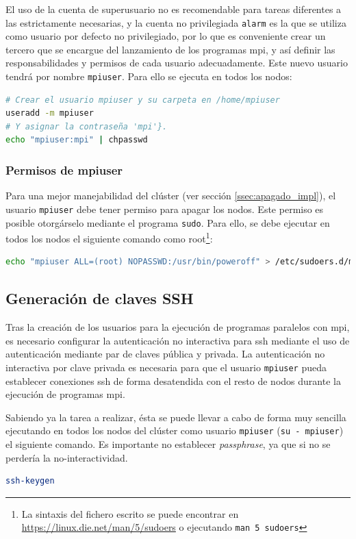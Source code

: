 El uso de la cuenta de superusuario no es recomendable para tareas diferentes a las estrictamente necesarias, y la cuenta no privilegiada \texttt{alarm} es la que se utiliza como usuario por defecto no privilegiado, por lo que es conveniente crear un tercero que se encargue del lanzamiento de los programas \acrshort{mpi}, y así definir las responsabilidades y permisos de cada usuario adecuadamente. Este nuevo usuario tendrá por nombre \texttt{mpiuser}. Para ello se ejecuta en todos los nodos:

\begin{lstlisting}[language=bash]
# Crear el usuario mpiuser y su carpeta en /home/mpiuser
useradd -m mpiuser
# Y asignar la contraseña 'mpi'}.
echo "mpiuser:mpi" | chpasswd
\end{lstlisting}

\subsubsection{Permisos de mpiuser}
Para una mejor manejabilidad del clúster (ver sección \ref{ssec:apagado_impl}), el usuario \texttt{mpiuser} debe tener permiso para apagar los nodos. Este permiso es posible otorgárselo mediante el programa \texttt{sudo}. Para ello, se debe ejecutar en todos los nodos el siguiente comando como root\footnote{La sintaxis del fichero escrito se puede encontrar en \url{https://linux.die.net/man/5/sudoers} o ejecutando \texttt{man 5 sudoers}}:

\begin{lstlisting}[language=bash]
echo "mpiuser ALL=(root) NOPASSWD:/usr/bin/poweroff" > /etc/sudoers.d/mpiuser_poweroff
\end{lstlisting}

\subsection{Generación de claves SSH}
\label{ssec:gen_ssh}
Tras la creación de los usuarios para la ejecución de programas paralelos con \acrshort{mpi}, es necesario configurar la autenticación no interactiva para \acrshort{ssh} mediante el uso de autenticación mediante par de claves pública y privada. La autenticación no interactiva por clave privada es necesaria para que el usuario \texttt{mpiuser} pueda establecer conexiones \acrshort{ssh} de forma desatendida con el resto de nodos durante la ejecución de programas \acrshort{mpi}.

Sabiendo ya la tarea a realizar, ésta se puede llevar a cabo de forma muy sencilla ejecutando en todos los nodos del clúster como usuario \texttt{mpiuser} (\texttt{su - mpiuser}) el siguiente comando. Es importante no establecer \textit{passphrase}, ya que si no se perdería la no-interactividad.
\begin{lstlisting}[language=bash]
ssh-keygen
\end{lstlisting}

